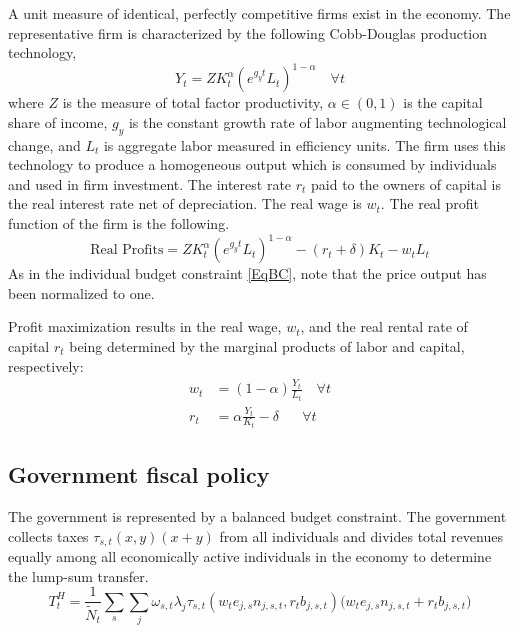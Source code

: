 \documentclass[letterpaper,12pt]{article}
\theoremstyle{definition}
\begin{document}
\begin{spacing}{1.5}
    A unit measure of identical, perfectly competitive firms exist in the economy. The representative firm is characterized by the following Cobb-Douglas production technology,
    \begin{equation}\label{EqCobbDougProd}
       Y_t = Z K_t^\alpha\left(e^{g_y t}L_t\right)^{1-\alpha} \quad \forall t
    \end{equation}
    where $Z$ is the measure of total factor productivity, $\alpha\in(0,1)$ is the capital share of income, $g_y$ is the constant growth rate of labor augmenting technological change, and $L_t$ is aggregate labor measured in efficiency units. The firm uses this technology to produce a homogeneous output which is consumed by individuals and used in firm investment.  The interest rate $r_t$ paid to the owners of capital is the real interest rate net of depreciation. The real wage is $w_t$.  The real profit function of the firm is the following.
    \begin{equation}\label{EqFirmProfit}
       \text{Real Profits} = Z K_t^\alpha\left(e^{g_y t}L_t\right)^{1-\alpha} - (r_t + \delta)K_t - w_t L_t
    \end{equation}
    As in the individual budget constraint \eqref{EqBC}, note that the price output has been normalized to one.

    Profit maximization results in the real wage, $w_t$, and the real rental rate of capital $r_t$ being determined by the marginal products of labor and capital, respectively:
    \begin{align}
       w_t &= (1-\alpha)\frac{Y_t}{L_t} \quad \forall t \label{EqFOCwage}\\
       r_t &= \alpha\frac{Y_t}{K_t} - \delta \quad\:\:\: \forall t \label{EqFOCrate}
    \end{align}


  \subsection{Government fiscal policy}\label{SecGovt}

    The government is represented by a balanced budget constraint. The government collects taxes $\tau_{s,t}(x,y)(x+y)$ from all individuals and divides total revenues equally among all economically active individuals in the economy to determine the lump-sum transfer.
    \begin{equation}\label{EqGovtBC}
      T^H_t = \frac{1}{\tilde N_t} \sum_s \sum_j \omega_{s,t}\lambda_j\tau_{s,t}(w_t e_{j,s}n_{j,s,t}, r_t b_{j,s,t})\bigl(w_t e_{j,s}n_{j,s,t} + r_t b_{j,s,t}\bigr)
    \end{equation}


\end{spacing}
\end{document}

